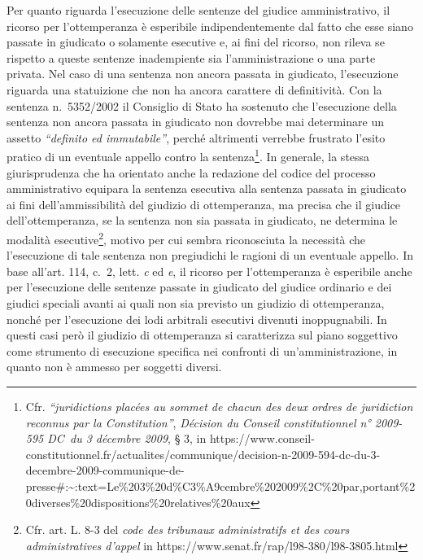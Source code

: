 \documentclass[12pt,it,a4paper,]{report}
\begin{document}
Per quanto riguarda l'esecuzione delle sentenze del giudice
amministrativo, il ricorso per l'ottemperanza è esperibile
indipendentemente dal fatto che esse siano passate in giudicato o
solamente esecutive e, ai fini del ricorso, non rileva se rispetto a
queste sentenze inadempiente sia l'amministrazione o una parte privata.
Nel caso di una sentenza non ancora passata in giudicato, l'esecuzione
riguarda una statuizione che non ha ancora carattere di definitività.
Con la sentenza n.~5352/2002 il Consiglio di Stato ha sostenuto che
l'esecuzione della sentenza non ancora passata in giudicato non dovrebbe
mai determinare un assetto \emph{``definito ed immutabile''}, perché
altrimenti verrebbe frustrato l'esito pratico di un eventuale appello
contro la sentenza\footnote{Cfr. \emph{``juridictions placées au sommet
  de chacun des deux ordres de juridiction reconnus par la
  Constitution''}, \emph{Décision du Conseil constitutionnel n° 2009-595
  DC~du 3 décembre 2009}, § 3, in
  https://www.conseil-constitutionnel.fr/actualites/communique/decision-n-2009-594-dc-du-3-decembre-2009-communique-de-presse\#:\textasciitilde:text=Le\%203\%20d\%C3\%A9cembre\%202009\%2C\%20par,portant\%20diverses\%20dispositions\%20relatives\%20aux}.
In generale, la stessa giurisprudenza che ha orientato anche la
redazione del codice del processo amministrativo equipara la sentenza
esecutiva alla sentenza passata in giudicato ai fini dell'ammissibilità
del giudizio di ottemperanza, ma precisa che il giudice
dell'ottemperanza, se la sentenza non sia passata in giudicato, ne
determina le modalità esecutive\footnote{Cfr. art. L. 8-3 del \emph{code
  des tribunaux administratifs et des cours administratives d'appel} in
  https://www.senat.fr/rap/l98-380/l98-3805.html}, motivo per cui sembra
riconosciuta la necessità che l'esecuzione di tale sentenza non
pregiudichi le ragioni di un eventuale appello. In base all'art. 114,
c.~2, lett. \emph{c} ed \emph{e}, il ricorso per l'ottemperanza è
esperibile anche per l'esecuzione delle sentenze passate in giudicato
del giudice ordinario e dei giudici speciali avanti ai quali non sia
previsto un giudizio di ottemperanza, nonché per l'esecuzione dei lodi
arbitrali esecutivi divenuti inoppugnabili. In questi casi però il
giudizio di ottemperanza si caratterizza sul piano soggettivo come
strumento di esecuzione specifica nei confronti di un'amministrazione,
in quanto non è ammesso per soggetti diversi.
\end{document}
